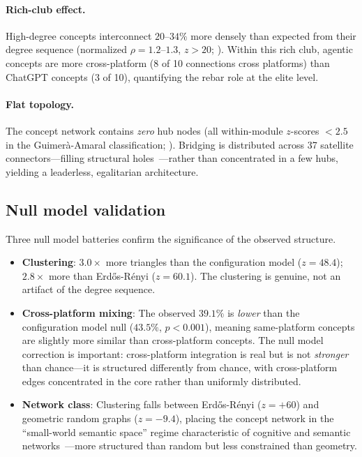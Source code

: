 \documentclass[11pt,twocolumn]{article}
\begin{document}
\paragraph{Rich-club effect.}
High-degree concepts interconnect $20$--$34\%$ more densely than expected from their degree sequence (normalized $\rho = 1.2$--$1.3$, $z > 20$; \citealt{colizza2006detecting}).
Within this rich club, agentic concepts are more cross-platform (8 of 10 connections cross platforms) than ChatGPT concepts (3 of 10), quantifying the rebar role at the elite level.

\paragraph{Flat topology.}
The concept network contains \emph{zero} hub nodes (all within-module $z$-scores $< 2.5$ in the Guimer\`a-Amaral classification; \citealt{guimera2005functional}).
Bridging is distributed across 37 satellite connectors---filling structural holes~\citep{burt1992structural}---rather than concentrated in a few hubs, yielding a leaderless, egalitarian architecture.


\subsection{Null model validation}
\label{sec:results:null}

Three null model batteries confirm the significance of the observed structure.

\begin{itemize}
  \item \textbf{Clustering}: $3.0\times$ more triangles than the configuration model ($z = 48.4$); $2.8\times$ more than Erd\H{o}s-R\'enyi ($z = 60.1$).  The clustering is genuine, not an artifact of the degree sequence.
  \item \textbf{Cross-platform mixing}: The observed $39.1\%$ is \emph{lower} than the configuration model null ($43.5\%$, $p < 0.001$), meaning same-platform concepts are slightly more similar than cross-platform concepts.  The null model correction is important: cross-platform integration is real but is not \emph{stronger} than chance---it is structured differently from chance, with cross-platform edges concentrated in the core rather than uniformly distributed.
  \item \textbf{Network class}: Clustering falls between Erd\H{o}s-R\'enyi ($z = +60$) and geometric random graphs ($z = -9.4$), placing the concept network in the ``small-world semantic space'' regime characteristic of cognitive and semantic networks~\citep{steyvers2005large,dedeyne2019small}---more structured than random but less constrained than geometry.
\end{itemize}
\end{document}
